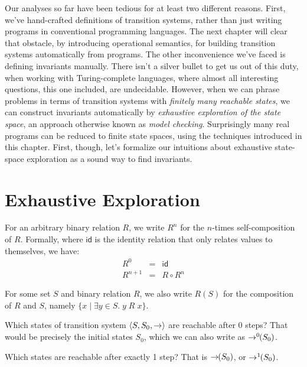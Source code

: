 \documentclass{amsbook}
\theoremstyle{definition}
\theoremstyle{remark}
\numberwithin{section}{chapter}
\numberwithin{equation}{chapter}
\begin{document}
Our analyses so far have been tedious for at least two different reasons.
First, we've hand-crafted definitions of transition systems, rather than just writing programs in conventional programming languages.
The next chapter will clear that obstacle, by introducing operational semantics, for building transition systems automatically from programs.
The other inconvenience we've faced is defining invariants manually.
There isn't a silver bullet to get us out of this duty, when working with Turing-complete languages, where almost all interesting questions, this one included, are undecidable.
However, when we can phrase problems in terms of transition systems with \emph{finitely many reachable states}, we can construct invariants automatically by \emph{exhaustive exploration of the state space}, an approach otherwise known as \emph{model checking}.
Surprisingly many real programs can be reduced to finite state spaces, using the techniques introduced in this chapter.
First, though, let's formalize our intuitions about exhaustive state-space exploration as a sound way to find invariants.

\section{Exhaustive Exploration}

For an arbitrary binary relation $R$, we write $R^n$ for the $n$-times self-composition of $R$.
Formally, where $\mathsf{id}$ is the identity relation that only relates values to themselves, we have:
\begin{eqnarray*}
  R^0 &=& \mathsf{id} \\
  R^{n+1} &=& R \circ R^n
\end{eqnarray*}

For some set $S$ and binary relation $R$, we also write $R(S)$ for the composition of $R$ and $S$, namely $\{x \mid \exists y \in S. \; y \; R \; x\}$.

\newcommand{\ns}[0]{\hspace{-.05in}}

Which states of transition system ${\left \langle S, S_0, \to \right \rangle}$ are reachable after 0 steps?
That would be precisely the initial states $S_0$, which we can also write as $\to^0\ns(S_0)$.

Which states are reachable after exactly 1 step?
That is $\to\ns(S_0)$, or $\to^1\ns(S_0)$.
\end{document}
